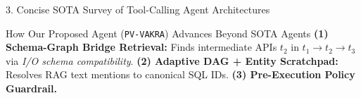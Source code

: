 \documentclass[aspectratio=169, 10pt]{beamer}
\begin{document}
\begin{frame}{3. Concise SOTA Survey of Tool-Calling Agent Architectures}
\vspace{0.08cm}
\begin{exampleblock}{\scriptsize How Our Proposed Agent (\texttt{PV-VAKRA}) Advances Beyond SOTA Agents}
\scriptsize
\textbf{(1) Schema-Graph Bridge Retrieval:} Finds intermediate APIs $t_2$ in $t_1 \rightarrow t_2 \rightarrow t_3$ via \textit{I/O schema compatibility}. \quad
\textbf{(2) Adaptive DAG + Entity Scratchpad:} Resolves RAG text mentions to canonical SQL IDs. \quad
\textbf{(3) Pre-Execution Policy Guardrail.}
\end{exampleblock}
\end{frame}

\end{document}
